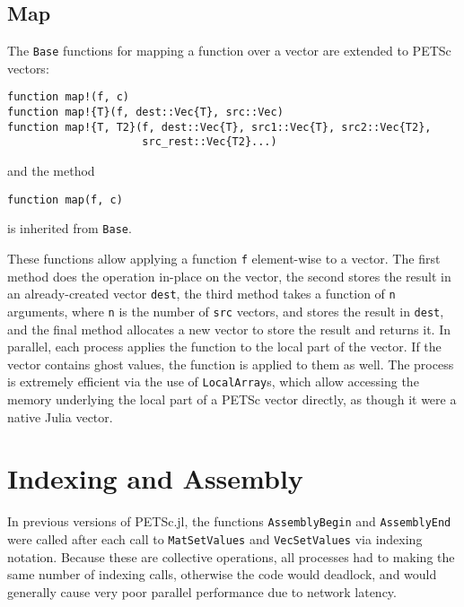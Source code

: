 \documentclass{article}
\begin{document}
\subsection{Map}
The \texttt{Base} functions for mapping a function over a vector are extended
to PETSc vectors:

\begin{verbatim}
function map!(f, c)
function map!{T}(f, dest::Vec{T}, src::Vec)
function map!{T, T2}(f, dest::Vec{T}, src1::Vec{T}, src2::Vec{T2},  
                     src_rest::Vec{T2}...)
\end{verbatim}

\noindent and the method
\begin{verbatim}
function map(f, c)
\end{verbatim}

\noindent is inherited from \texttt{Base}.

These functions allow applying a function \texttt{f} element-wise to a vector.
The first method does the operation in-place on the vector, the second stores
the result in an already-created vector \texttt{dest}, the third method 
takes a function of \texttt{n} arguments, where \texttt{n} is the number of
\texttt{src} vectors, and stores the result in \texttt{dest}, and the final 
method allocates a new vector to store the result and returns it.
In parallel, each process applies the function to the local part of the vector.
If the vector contains ghost values, the function is applied to them as well.
The process is extremely efficient via the use of \texttt{LocalArray}s, which
allow accessing the memory underlying the local part of a PETSc vector directly,
as though it were a native Julia vector.

\section{Indexing and Assembly}
In previous versions of PETSc.jl, the functions \texttt{AssemblyBegin} and 
\texttt{AssemblyEnd} were called after each call to \texttt{MatSetValues} and
\texttt{VecSetValues} via indexing notation.  Because these are collective 
operations, all processes had to making the same number of indexing calls, 
otherwise the code would deadlock, and would generally cause very poor parallel
performance due to network latency.
\end{document}
